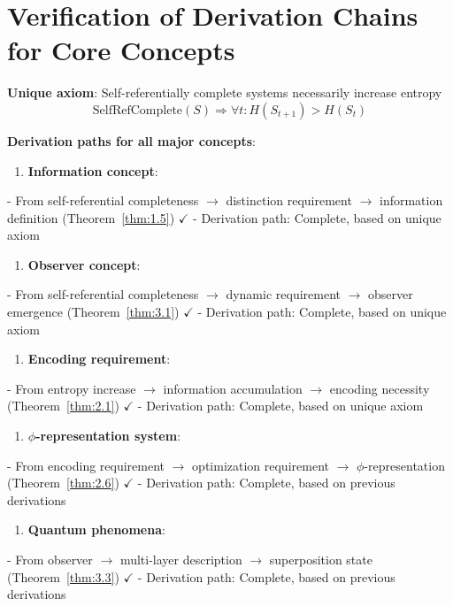 
\section{Verification of Derivation Chains for Core Concepts}
\label{sec:ch10_completeness:verification-of-derivation-chains-for-core-concepts}

\textbf{Unique axiom}: Self-referentially complete systems necessarily increase entropy
\begin{equation}
\text{SelfRefComplete}(S) \Rightarrow \forall t: H(S_{t+1}) > H(S_t)
\end{equation}

\textbf{Derivation paths for all major concepts}:

\begin{enumerate}
\item \textbf{Information concept}:
\end{enumerate}
   - From self-referential completeness $\rightarrow$ distinction requirement $\rightarrow$ information definition (Theorem~\ref{thm:1.5}) $\checkmark$
   - Derivation path: Complete, based on unique axiom

\begin{enumerate}
\item \textbf{Observer concept}:
\end{enumerate}
   - From self-referential completeness $\rightarrow$ dynamic requirement $\rightarrow$ observer emergence (Theorem~\ref{thm:3.1}) $\checkmark$
   - Derivation path: Complete, based on unique axiom

\begin{enumerate}
\item \textbf{Encoding requirement}:
\end{enumerate}
   - From entropy increase $\rightarrow$ information accumulation $\rightarrow$ encoding necessity (Theorem~\ref{thm:2.1}) $\checkmark$
   - Derivation path: Complete, based on unique axiom

\begin{enumerate}
\item \textbf{$\phi$-representation system}:
\end{enumerate}
   - From encoding requirement $\rightarrow$ optimization requirement $\rightarrow$ $\phi$-representation (Theorem~\ref{thm:2.6}) $\checkmark$
   - Derivation path: Complete, based on previous derivations

\begin{enumerate}
\item \textbf{Quantum phenomena}:
\end{enumerate}
   - From observer $\rightarrow$ multi-layer description $\rightarrow$ superposition state (Theorem~\ref{thm:3.3}) $\checkmark$
   - Derivation path: Complete, based on previous derivations

